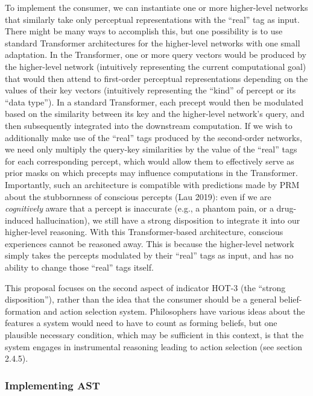 \documentclass[12pt]{article}
\begin{document}
To implement the consumer, we can instantiate one or more higher-level networks that similarly take only perceptual representations with the ``real'' tag as input. There might be many ways to accomplish this, but one possibility is to use standard Transformer architectures for the higher-level networks with one small adaptation. In the Transformer, one or more query vectors would be produced by the higher-level network (intuitively representing the current computational goal) that would then attend to first-order perceptual representations depending on the values of their key vectors (intuitively representing the ``kind'' of percept or its ``data type''). In a standard Transformer, each precept would then be modulated based on the similarity between its key and the higher-level network’s query, and then subsequently integrated into the downstream computation. If we wish to additionally make use of the ``real'' tags produced by the second-order networks, we need only multiply the query-key similarities by the value of the ``real'' tags for each corresponding percept, which would allow them to effectively serve as prior masks on which precepts may influence computations in the Transformer. Importantly, such an architecture is compatible with predictions made by PRM about the stubbornness of conscious percepts (Lau 2019): even if we are \textit{cognitively} aware that a percept is inaccurate (e.g., a phantom pain, or a drug-induced hallucination), we still have a strong disposition to integrate it into our higher-level reasoning. With this Transformer-based architecture, conscious experiences cannot be reasoned away. This is because the higher-level network simply takes the percepts modulated by their ``real'' tags as input, and has no ability to change those ``real'' tags itself.

This proposal focuses on the second aspect of indicator HOT-3 (the ``strong disposition''), rather than the idea that the consumer should be a general belief-formation and action selection system. Philosophers have various ideas about the features a system would need to have to count as forming beliefs, but one plausible necessary condition, which may be sufficient in this context, is that the system engages in instrumental reasoning leading to action selection (see section 2.4.5).

\subsubsection{Implementing AST}
\end{document}
